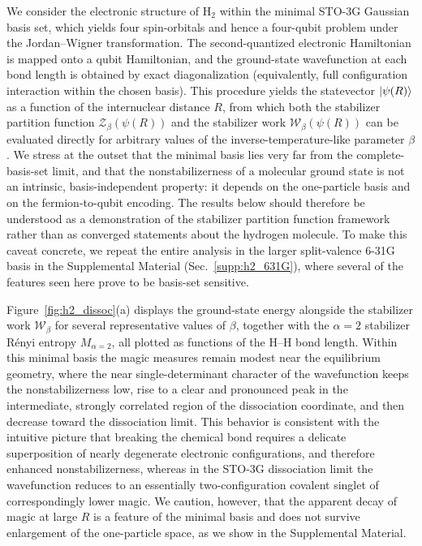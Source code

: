 \documentclass[aps,pra,superscriptaddress,twocolumn,longbibliography]{revtex4-2}
\begin{document}
We consider the electronic structure of $\mathrm{H}_2$ within the minimal STO-3G Gaussian basis set, which yields four spin-orbitals and hence a four-qubit problem under the Jordan--Wigner transformation. The second-quantized electronic Hamiltonian is mapped onto a qubit Hamiltonian, and the ground-state wavefunction at each bond length is obtained by exact diagonalization (equivalently, full configuration interaction within the chosen basis). This procedure yields the statevector $\ket{\psi(R)}$ as a function of the internuclear distance $R$, from which both the stabilizer partition function $\mathcal{Z}_{\beta}(\psi(R))$ and the stabilizer work $\mathcal{W}_{\beta}(\psi(R))$ can be evaluated directly for arbitrary values of the inverse-temperature-like parameter $\beta$. We stress at the outset that the minimal basis lies very far from the complete-basis-set limit, and that the nonstabilizerness of a molecular ground state is not an intrinsic, basis-independent property: it depends on the one-particle basis and on the fermion-to-qubit encoding. The results below should therefore be understood as a demonstration of the stabilizer partition function framework rather than as converged statements about the hydrogen molecule. To make this caveat concrete, we repeat the entire analysis in the larger split-valence 6-31G basis in the Supplemental Material (Sec.~\ref{supp:h2_631G}), where several of the features seen here prove to be basis-set sensitive.

Figure~\ref{fig:h2_dissoc}(a) displays the ground-state energy alongside the stabilizer work $\mathcal{W}_{\beta}$ for several representative values of $\beta$, together with the $\alpha=2$ stabilizer R\'{e}nyi entropy $M_{\alpha=2}$, all plotted as functions of the H--H bond length. Within this minimal basis the magic measures remain modest near the equilibrium geometry, where the near single-determinant character of the wavefunction keeps the nonstabilizerness low, rise to a clear and pronounced peak in the intermediate, strongly correlated region of the dissociation coordinate, and then decrease toward the dissociation limit. This behavior is consistent with the intuitive picture that breaking the chemical bond requires a delicate superposition of nearly degenerate electronic configurations, and therefore enhanced nonstabilizerness, whereas in the STO-3G dissociation limit the wavefunction reduces to an essentially two-configuration covalent singlet of correspondingly lower magic. We caution, however, that the apparent decay of magic at large $R$ is a feature of the minimal basis and does not survive enlargement of the one-particle space, as we show in the Supplemental Material.
\end{document}
